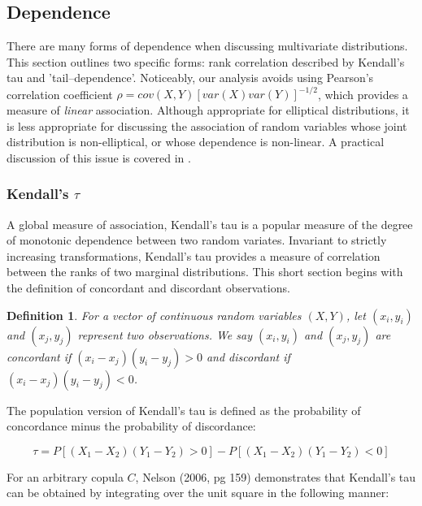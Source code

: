 \documentclass[12pt]{article}
\newtheorem{defn}{Definition}
\begin{document}
\subsection{Dependence}

There are many forms of dependence when discussing multivariate distributions. This section outlines two specific forms: rank correlation described by Kendall's tau and 'tail--dependence'. Noticeably, our analysis avoids using Pearson's correlation coefficient $\rho = cov\left(X,Y\right)\left[var\left(X\right)var\left(Y\right)\right]^{-1/2}$, which provides a measure of \textit{linear} association. Although appropriate for elliptical distributions, it is less appropriate for discussing the association of random variables whose joint distribution is non-elliptical, or whose dependence is non-linear. A practical discussion of this issue is covered in \cite{Embrechts_McNeil_Straumann_2002}.

\subsubsection{Kendall's $\tau$}

A global measure of association, Kendall's tau is a popular measure of the degree of monotonic dependence between two random variates. Invariant to strictly increasing transformations, Kendall's tau provides a measure of correlation between the ranks of two marginal distributions. This short section begins with the definition of concordant and discordant observations.

\begin{defn}
	For a vector of continuous random variables $\left(X,Y\right)$, let $\left(x_{i},y_{i}\right)$ and $\left(x_{j},y_{j}\right)$ represent two observations. We say $\left(x_{i},y_{i}\right)$ and $\left(x_{j},y_{j}\right)$ are concordant if $\left(x_{i} - x_{j}\right)\left(y_{i}-y_{j}\right) > 0$ and discordant if $\left(x_{i}-x_{j}\right)\left(y_{i} - y_{j}\right) < 0$.
\end{defn}

The population version of Kendall's tau is defined as the probability of concordance minus the probability of discordance:

\begin{equation}
	\tau = P\left[\left(X_{1} - X_{2}\right)\left(Y_{1} - Y_{2}\right) > 0\right] - P\left[\left(X_{1} - X_{2}\right)\left(Y_{1} - Y_{2}\right) < 0\right]
\end{equation}

For an arbitrary copula $C$, Nelson (2006, pg 159) demonstrates that Kendall's tau can be obtained by integrating over the unit square in the following manner:
\end{document}
